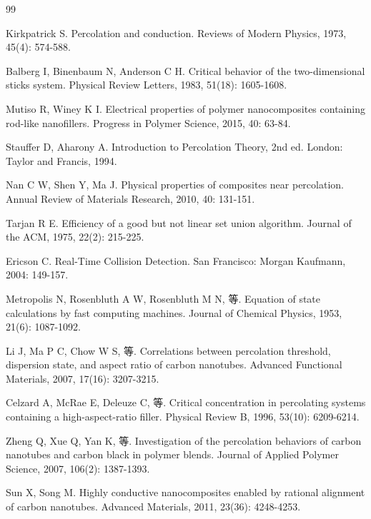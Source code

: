 
\begin{thebibliography}{99}

 Kirkpatrick S. Percolation and conduction. Reviews of Modern Physics, 1973, 45(4): 574-588.

 Balberg I, Binenbaum N, Anderson C H. Critical behavior of the two-dimensional sticks system. Physical Review Letters, 1983, 51(18): 1605-1608.

 Mutiso R, Winey K I. Electrical properties of polymer nanocomposites containing rod-like nanofillers. Progress in Polymer Science, 2015, 40: 63-84.

 Stauffer D, Aharony A. Introduction to Percolation Theory, 2nd ed. London: Taylor and Francis, 1994.

 Nan C W, Shen Y, Ma J. Physical properties of composites near percolation. Annual Review of Materials Research, 2010, 40: 131-151.

 Tarjan R E. Efficiency of a good but not linear set union algorithm. Journal of the ACM, 1975, 22(2): 215-225.

 Ericson C. Real-Time Collision Detection. San Francisco: Morgan Kaufmann, 2004: 149-157.

 Metropolis N, Rosenbluth A W, Rosenbluth M N, 等. Equation of state calculations by fast computing machines. Journal of Chemical Physics, 1953, 21(6): 1087-1092.

 Li J, Ma P C, Chow W S, 等. Correlations between percolation threshold, dispersion state, and aspect ratio of carbon nanotubes. Advanced Functional Materials, 2007, 17(16): 3207-3215.

 Celzard A, McRae E, Deleuze C, 等. Critical concentration in percolating systems containing a high-aspect-ratio filler. Physical Review B, 1996, 53(10): 6209-6214.

 Zheng Q, Xue Q, Yan K, 等. Investigation of the percolation behaviors of carbon nanotubes and carbon black in polymer blends. Journal of Applied Polymer Science, 2007, 106(2): 1387-1393.

 Sun X, Song M. Highly conductive nanocomposites enabled by rational alignment of carbon nanotubes. Advanced Materials, 2011, 23(36): 4248-4253.

\end{thebibliography}
